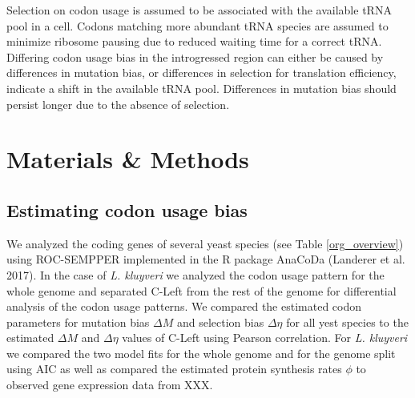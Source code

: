 \documentclass[letter,12pt]{article}
\begin{document}
Selection on codon usage is assumed to be associated with the available tRNA pool in a cell. 
Codons matching more abundant tRNA species are assumed to minimize ribosome pausing due to reduced waiting time for a correct tRNA. 
Differing codon usage bias in the introgressed region can either be caused by differences in mutation bias, or differences in selection for translation efficiency, indicate a shift in the available tRNA pool.
Differences in mutation bias should persist longer due to the absence of selection.   

	
\section{Materials \& Methods}

\subsection{Estimating codon usage bias}
We analyzed the coding genes of several yeast species (see Table \ref{org_overview}) using ROC-SEMPPER \cite{gilchrist2015} implemented in the R package AnaCoDa (Landerer et al. 2017).
In the case of \textit{L. kluyveri} we analyzed the codon usage pattern for the whole genome and separated C-Left from the rest of the genome for differential analysis of the codon usage patterns.
We compared the estimated codon parameters for mutation bias $\Delta M$ and selection bias $\Delta \eta$ for all yest species to the estimated $\Delta M$ and $\Delta \eta$ values of C-Left using Pearson correlation.
For \textit{L. kluyveri} we compared the two model fits for the whole genome and for the genome split using AIC as well as compared the estimated protein synthesis rates $\phi$ to observed gene expression data from XXX.
\end{document}
